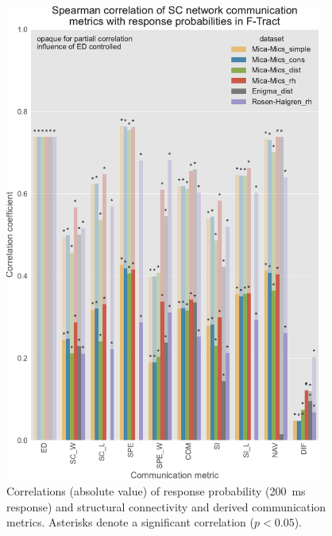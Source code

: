 \begin{figure}
    \centering
    \includegraphics[width=0.93\textwidth]{images/nootebook_generated/ftract_results/MNI-HCP-MMP1/5/ED0/0.25/long/Spearman_correlation_of_SC_network_communication_metrics_with_response_probabilities_in_F-Tract.pdf}
    \caption[F-Tract probability correlations - all $SC$ matrices]{Correlations (absolute value) of response probability (200~ms response) and structural connectivity and derived communication metrics. Asterisks denote a significant correlation ($p<0.05$).}
    \label{fig:ftract_alldata_long_probabilities}
\end{figure}


